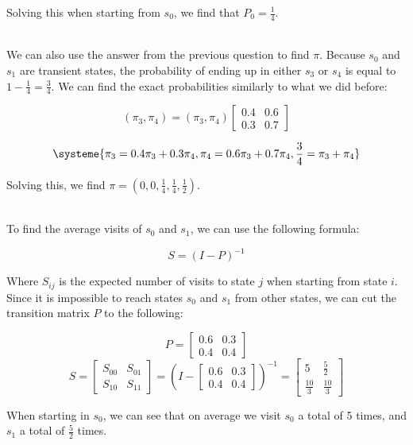 \documentclass[12pt]{article}
\begin{document}
\noindent
Solving this when starting from $s_0$, we find that $P_0 = \frac{1}{4}$.

\noindent
\\
We can also use the answer from the previous question to find $\pi$.
Because $s_0$ and $s_1$ are transient states, the probability of ending up in either $s_3$ or $s_4$ is equal to $1 - \frac{1}{4} = \frac{3}{4}$.
We can find the exact probabilities similarly to what we did before:

\[ (\pi_3, \pi_4) = (\pi_3, \pi_4)\begin{bmatrix}
    0.4 & 0.6 \\
    0.3 & 0.7
\end{bmatrix} \]

\begin{equation*}
    \systeme{
        \pi_3 = 0.4\pi_3 + 0.3\pi_4,
        \pi_4 = 0.6\pi_3 + 0.7\pi_4,
        \frac{3}{4} = \pi_3 + \pi_4
    }
\end{equation*}

\noindent
Solving this, we find $\pi = \left( 0, 0, \frac{1}{4}, \frac{1}{4}, \frac{1}{2} \right)$.

\noindent
\\
To find the average visits of $s_0$ and $s_1$, we can use the following formula:

\[ S = (I - P)^{-1} \]

\noindent
Where $S_{ij}$ is the expected number of visits to state $j$ when starting from state $i$.
Since it is impossible to reach states $s_0$ and $s_1$ from other states, we can cut the transition matrix $P$ to the following:

\[ P = \begin{bmatrix}
    0.6 & 0.3 \\
    0.4 & 0.4
\end{bmatrix} \]
\[ S = \begin{bmatrix}
    S_{00} & S_{01} \\
    S_{10} & S_{11}
\end{bmatrix} = \left( I - \begin{bmatrix}
    0.6 & 0.3 \\
    0.4 & 0.4
\end{bmatrix} \right)^{-1} = \begin{bmatrix}
    5 & \frac{5}{2} \\
    \frac{10}{3} & \frac{10}{3}
\end{bmatrix} \]

\noindent
When starting in $s_0$, we can see that on average we visit $s_0$ a total of 5 times, and $s_1$ a total of $\frac{5}{2}$ times.
\end{document}
